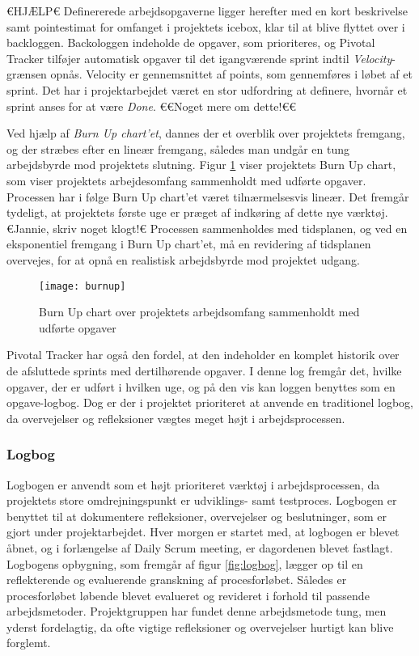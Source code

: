     €HJÆLP€ 
	Definererede arbejdsopgaverne ligger herefter med en kort beskrivelse samt pointestimat for omfanget i projektets icebox, klar til at blive flyttet over i backloggen. Backologgen indeholde de opgaver, som prioriteres, og Pivotal Tracker tilføjer automatisk opgaver til det igangværende sprint indtil \textit{Velocity}-grænsen opnås. Velocity er gennemsnittet af points, som gennemføres i løbet af et sprint. Det har i projektarbejdet været en stor udfordring at definere, hvornår et sprint anses for at være \textit{Done}. €€Noget mere om dette!€€    
	
	Ved hjælp af \textit{Burn Up chart'et}, dannes der et overblik over projektets fremgang, og der stræbes efter en lineær fremgang, således man undgår en tung arbejdsbyrde mod projektets slutning. Figur \ref{fig:burnup} viser projektets Burn Up chart, som viser projektets arbejdesomfang sammenholdt med udførte opgaver. Processen har i følge Burn Up chart'et været tilnærmelsesvis lineær. Det fremgår tydeligt, at projektets første uge er præget af indkøring af dette nye værktøj. €Jannie, skriv noget klogt!€
	Processen sammenholdes med tidsplanen, og ved en eksponentiel fremgang i Burn Up chart'et, må en revidering af tidsplanen overvejes, for at opnå en realistisk arbejdsbyrde mod projektet udgang.  
		
	\begin{figure}[htb]
	\centering
	\texttt{[image: burnup]}
	\caption{Burn Up chart over projektets arbejdsomfang sammenholdt med udførte opgaver}
	\label{fig:burnup}	
	\end{figure}
	    	
	Pivotal Tracker har også den fordel, at den indeholder en komplet historik over de afsluttede sprints med dertilhørende opgaver. I denne log fremgår det, hvilke opgaver, der er udført i hvilken uge, og på den vis kan loggen benyttes som en opgave-logbog. Dog er der i projektet prioriteret at anvende en traditionel logbog, da overvejelser og refleksioner vægtes meget højt i arbejdsprocessen.	
	
	\subsubsection{Logbog}
	Logbogen er anvendt som et højt prioriteret værktøj i arbejdsprocessen, da projektets store omdrejningspunkt er udviklings- samt testproces. Logbogen er benyttet til at dokumentere refleksioner, overvejelser og beslutninger, som er gjort under projektarbejdet. Hver morgen er startet med, at logbogen er blevet åbnet, og i forlængelse af Daily Scrum meeting, er dagordenen blevet  fastlagt. Logbogens opbygning, som fremgår af figur \ref{fig:logbog}, lægger op til en reflekterende og evaluerende granskning af procesforløbet. Således er procesforløbet løbende blevet evalueret og revideret i forhold til passende arbejdsmetoder. Projektgruppen har fundet denne arbejdsmetode tung, men yderst fordelagtig, da ofte vigtige refleksioner og overvejelser hurtigt kan blive forglemt. 
	
